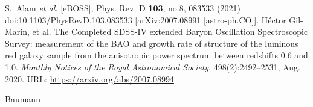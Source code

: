 \begin{thebibliography}{999}


S.~Alam \textit{et al.} [eBOSS],
Phys. Rev. D \textbf{103}, no.8, 083533 (2021)
doi:10.1103/PhysRevD.103.083533
[arXiv:2007.08991 [astro-ph.CO]].
Héctor Gil-Marín, et al.
\newblock The Completed {SDSS}-{IV} extended Baryon Oscillation Spectroscopic Survey: measurement of the {BAO} and growth rate of structure of the luminous red galaxy sample from the anisotropic power spectrum between redshifts 0.6 and 1.0.
\newblock \emph{Monthly Notices of the Royal Astronomical Society}, 498(2):2492--2531, Aug. 2020.
\newblock URL: \url{https://arxiv.org/abs/2007.08994}


Baumann



\end{thebibliography}

